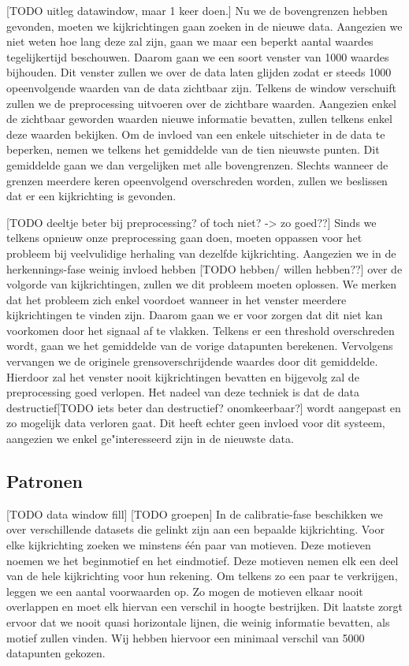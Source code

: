 \documentclass{article}
\begin{document}
[TODO uitleg datawindow, maar 1 keer doen.]
Nu we de bovengrenzen hebben gevonden, moeten we kijkrichtingen gaan zoeken in de nieuwe data. Aangezien we niet weten hoe lang deze zal zijn, gaan we maar een beperkt aantal waardes tegelijkertijd beschouwen. Daarom gaan we een soort venster van 1000 waardes bijhouden. Dit venster zullen we over de data laten glijden zodat er steeds 1000 opeenvolgende waarden van de data zichtbaar zijn. Telkens de window verschuift zullen we de preprocessing uitvoeren over de zichtbare waarden. Aangezien enkel de zichtbaar geworden waarden nieuwe informatie bevatten, zullen telkens enkel deze waarden bekijken. Om de invloed van een enkele uitschieter in de data te beperken, nemen we telkens het gemiddelde van de tien nieuwste punten. Dit gemiddelde gaan we dan vergelijken met alle bovengrenzen. Slechts wanneer de grenzen meerdere keren opeenvolgend overschreden worden, zullen we beslissen dat er een kijkrichting is gevonden.

[TODO deeltje beter bij preprocessing? of toch niet? -> zo goed??]
Sinds we telkens opnieuw onze preprocessing gaan doen, moeten oppassen voor het probleem bij veelvulidige herhaling van dezelfde kijkrichting. Aangezien we in de herkennings-fase weinig invloed hebben [TODO hebben/ willen hebben??] over de volgorde van kijkrichtingen, zullen we dit probleem moeten oplossen. We merken dat het probleem zich enkel voordoet wanneer in het venster meerdere kijkrichtingen te vinden zijn. Daarom gaan we er voor zorgen dat dit niet kan voorkomen door het signaal af te vlakken. Telkens er een threshold overschreden wordt, gaan we het gemiddelde van de vorige datapunten berekenen. Vervolgens vervangen we de originele grensoverschrijdende waardes door dit gemiddelde. Hierdoor zal het venster nooit kijkrichtingen bevatten en bijgevolg zal de preprocessing goed verlopen. Het nadeel van deze techniek is dat de data destructief[TODO iets beter dan destructief? onomkeerbaar?] wordt aangepast en zo mogelijk data verloren gaat. Dit heeft echter geen invloed voor dit systeem, aangezien we enkel ge"interesseerd zijn in de nieuwste data.


\subsection{Patronen}

[TODO data window fill]
[TODO groepen]
In de calibratie-fase beschikken we over verschillende datasets die gelinkt zijn aan een bepaalde kijkrichting. Voor elke kijkrichting zoeken we minstens één paar van motieven. Deze motieven noemen we het beginmotief en het eindmotief. Deze motieven nemen elk een deel van de hele kijkrichting voor hun rekening. Om telkens zo een paar te verkrijgen, leggen we een aantal voorwaarden op. Zo mogen de motieven elkaar nooit overlappen en moet elk hiervan een verschil in hoogte bestrijken. Dit laatste zorgt ervoor dat we nooit quasi horizontale lijnen, die weinig informatie bevatten, als motief zullen vinden. Wij hebben hiervoor een minimaal verschil van 5000 datapunten gekozen.
\end{document}
